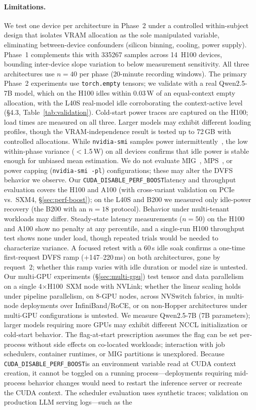 \documentclass[sigconf,nonacm]{acmart}
\newcommand{\perfboost}{\texttt{CUDA\_\hspace{0pt}DISABLE\_\hspace{0pt}PERF\_\hspace{0pt}BOOST}}
\begin{document}
\paragraph{Limitations.} We test one device per architecture in Phase~2 under a controlled within-subject design that isolates VRAM allocation as the sole manipulated variable, eliminating between-device confounders (silicon binning, cooling, power supply). Phase~1 complements this with \num{335267} samples across 14~H100 devices, bounding inter-device slope variation to below measurement sensitivity. All three architectures use $n=40$ per phase (20-minute recording windows). The primary Phase~2 experiments use \texttt{torch.empty} tensors; we validate with a real Qwen2.5-7B model, which on the H100 idles within 0.03\,W of an equal-context empty allocation, with the L40S real-model idle corroborating the context-active level (\S4.3, Table~\ref{tab:validation}). Cold-start power traces are captured on the H100; load times are measured on all three. Larger models may exhibit different loading profiles, though the VRAM-independence result is tested up to 72\,GB with controlled allocations. While \texttt{nvidia-smi} samples power intermittently~\cite{burtscher-power}, the low within-phase variance ($<$1.5\,W) on all devices confirms that idle power is stable enough for unbiased mean estimation. We do not evaluate MIG~\cite{nvidia-mig}, MPS~\cite{nvidia-mps}, or power capping (\texttt{nvidia-smi -pl}) configurations; these may alter the DVFS behavior we observe. Our \perfboost latency and throughput evaluation covers the H100 and A100 (with cross-variant validation on PCIe vs.\ SXM4, \S\ref{sec:perf-boost}); on the L40S and B200 we measured only idle-power recovery (the B200 with an $n=18$ protocol). Behavior under multi-tenant workloads may differ. Steady-state latency measurements ($n=50$) on the H100 and A100 show no penalty at any percentile, and a single-run H100 throughput test shows none under load, though repeated trials would be needed to characterize variance. A focused retest with a 60\,s idle soak confirms a one-time first-request DVFS ramp ($+$147--220\,ms) on both architectures, gone by request~2; whether this ramp varies with idle duration or model size is untested. Our multi-GPU experiments (\S\ref{sec:multi-gpu}) test tensor and data parallelism on a single 4$\times$H100~SXM node with NVLink; whether the linear scaling holds under pipeline parallelism, on 8-GPU nodes, across NVSwitch fabrics, in multi-node deployments over InfiniBand/RoCE, or on non-Hopper architectures under multi-GPU configurations is untested. We measure Qwen2.5-7B (7B parameters); larger models requiring more GPUs may exhibit different NCCL initialization or cold-start behavior. The flag-at-start prescription assumes the flag can be set per-process without side effects on co-located workloads; interaction with job schedulers, container runtimes, or MIG partitions is unexplored. Because \perfboost is an environment variable read at CUDA context creation, it cannot be toggled on a running process---deployments requiring mid-process behavior changes would need to restart the inference server or recreate the CUDA context. The scheduler evaluation uses synthetic traces; validation on production LLM serving logs---such as the 
\end{document}
